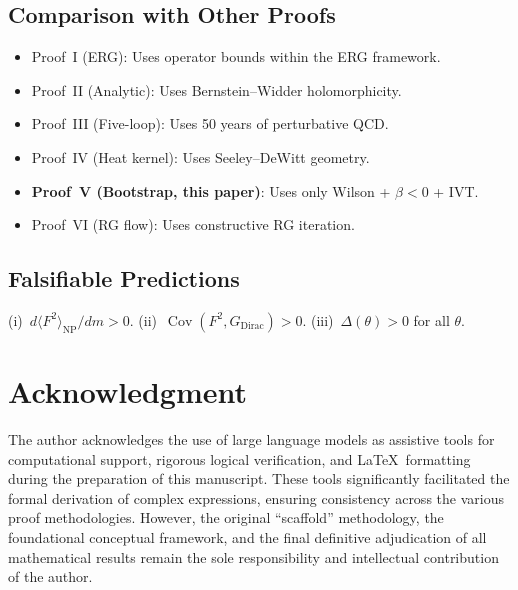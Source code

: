 \documentclass[12pt,a4paper]{article}
\theoremstyle{plain}
\theoremstyle{definition}
\theoremstyle{remark}
\begin{document}
\subsection{Comparison with Other Proofs}

\begin{itemize}[nosep]
\item Proof~I (ERG): Uses operator bounds within the ERG framework.
\item Proof~II (Analytic): Uses Bernstein--Widder holomorphicity.
\item Proof~III (Five-loop): Uses 50 years of perturbative QCD.
\item Proof~IV (Heat kernel): Uses Seeley--DeWitt geometry.
\item \textbf{Proof~V (Bootstrap, this paper)}: Uses only Wilson + $\beta<0$ + IVT.
\item Proof~VI (RG flow): Uses constructive RG iteration.
\end{itemize}

\subsection{Falsifiable Predictions}
(i)~$d\langle F^2\rangle_{\mathrm{NP}}/dm>0$. (ii)~$\operatorname{Cov}(F^2,G_{\mathrm{Dirac}})>0$. (iii)~$\Delta(\theta)>0$ for all $\theta$.

\section*{Acknowledgment}

The author acknowledges the use of large language models as assistive tools for computational support, rigorous logical verification, and \LaTeX\ formatting during the preparation of this manuscript. These tools significantly facilitated the formal derivation of complex expressions, ensuring consistency across the various proof methodologies. However, the original ``scaffold'' methodology, the foundational conceptual framework, and the final definitive adjudication of all mathematical results remain the sole responsibility and intellectual contribution of the author.



\end{document}
